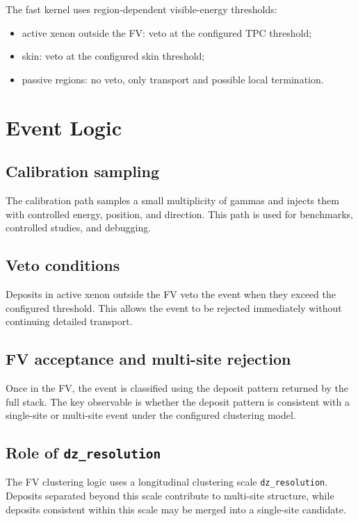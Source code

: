 \documentclass[11pt]{article}
\begin{document}
The fast kernel uses region-dependent visible-energy thresholds:

\begin{itemize}
\item active xenon outside the FV:
  veto at the configured TPC threshold;
\item skin:
  veto at the configured skin threshold;
\item passive regions:
  no veto, only transport and possible local termination.
\end{itemize}

\section{Event Logic}

\subsection{Calibration sampling}

The calibration path samples a small multiplicity of gammas and injects them
with controlled energy, position, and direction. This path is used for
benchmarks, controlled studies, and debugging.

\subsection{Veto conditions}

Deposits in active xenon outside the FV veto the event when they exceed the
configured threshold. This allows the event to be rejected immediately without
continuing detailed transport.

\subsection{FV acceptance and multi-site rejection}

Once in the FV, the event is classified using the deposit pattern returned by
the full stack. The key observable is whether the deposit pattern is consistent
with a single-site or multi-site event under the configured clustering model.

\subsection{Role of \texttt{dz\_resolution}}

The FV clustering logic uses a longitudinal clustering scale
\texttt{dz\_resolution}. Deposits separated beyond this scale contribute to
multi-site structure, while deposits consistent within this scale may be merged
into a single-site candidate.
\end{document}
